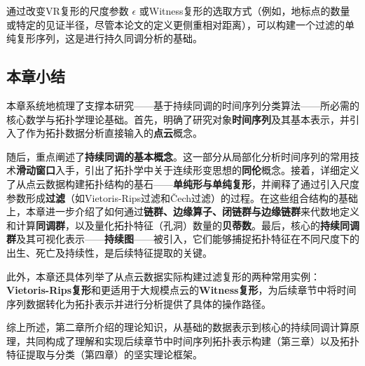 通过改变VR复形的尺度参数 $\epsilon$ 或Witness复形的选取方式（例如，地标点的数量或特定的见证半径，尽管本论文的定义更侧重相对距离），可以构建一个过滤的单纯复形序列，这是进行持久同调分析的基础。
\subsection{本章小结}
本章系统地梳理了支撑本研究——基于持续同调的时间序列分类算法——所必需的核心数学与拓扑学理论基础。首先，明确了研究对象\textbf{时间序列}及其基本表示，并引入了作为拓扑数据分析直接输入的\textbf{点云}概念。

随后，重点阐述了\textbf{持续同调的基本概念}。这一部分从局部化分析时间序列的常用技术\textbf{滑动窗口}入手，引出了拓扑学中关于连续形变思想的\textbf{同伦}概念。接着，详细定义了从点云数据构建拓扑结构的基石——\textbf{单纯形与单纯复形}，并阐释了通过引入尺度参数形成\textbf{过滤}（如Vietoris-Rips过滤和Čech过滤）的过程。在这些组合结构的基础上，本章进一步介绍了如何通过\textbf{链群、边缘算子、闭链群与边缘链群}来代数地定义和计算\textbf{同调群}，以及量化拓扑特征（孔洞）数量的\textbf{贝蒂数}。最后，核心的\textbf{持续同调群}及其可视化表示——\textbf{持续图}——被引入，它们能够捕捉拓扑特征在不同尺度下的出生、死亡及持续性，是后续特征提取的关键。

此外，本章还具体列举了从点云数据实际构建过滤复形的两种常用实例：\textbf{Vietoris-Rips复形}和更适用于大规模点云的\textbf{Witness复形}，为后续章节中将时间序列数据转化为拓扑表示并进行分析提供了具体的操作路径。

综上所述，第二章所介绍的理论知识，从基础的数据表示到核心的持续同调计算原理，共同构成了理解和实现后续章节中时间序列拓扑表示构建（第三章）以及拓扑特征提取与分类（第四章）的坚实理论框架。